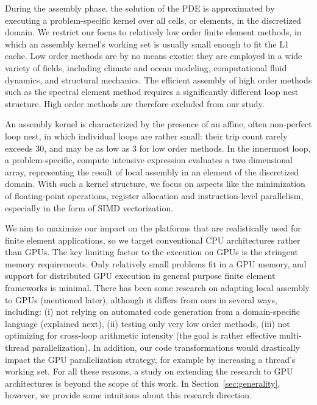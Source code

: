During the assembly phase, the solution of the PDE is approximated by executing a problem-specific kernel over all cells, or elements, in the discretized domain. We restrict our focus to relatively low order finite element methods, in which an assembly kernel's working set is usually small enough to fit the L1 cache. Low order methods are by no means exotic: they are employed in a wide variety of fields, including climate and ocean modeling, computational fluid dynamics, and structural mechanics. The efficient assembly of high order methods such as the spectral element method \citep{spencer} requires a significantly different loop nest structure. High order methods are therefore excluded from our study.

An assembly kernel is characterized by the presence of an affine, often non-perfect loop nest, in which individual loops are rather small: their trip count rarely exceeds 30, and may be as low as 3 for low order methods. In the innermost loop, a problem-specific, compute intensive expression evaluates a two dimensional array, representing the result of local assembly in an element of the discretized domain. With such a kernel structure, we focus on aspects like the minimization of floating-point operations, register allocation and instruction-level parallelism, especially in the form of SIMD vectorization.

We aim to maximize our impact on the platforms that are realistically used for finite element applications, so we target conventional CPU architectures rather than GPUs. 
The key limiting factor to the execution on GPUs is the stringent memory requirements. Only relatively small problems fit in a GPU memory, and support for distributed GPU execution in general purpose finite element frameworks is minimal. There has been some research on adapting local assembly to GPUs (mentioned later), although it differs from ours in several ways, including: (i) not relying on automated code generation from a domain-specific language (explained next), (ii) testing only very low order methods, (iii) not optimizing for cross-loop arithmetic intensity (the goal is rather effective multi-thread parallelization). In addition, our code transformations would drastically impact the GPU parallelization strategy, for example by increasing a thread's working set. For all these reasons, a study on extending the research to GPU architectures is beyond the scope of this work. In Section~\ref{sec:generality}, however, we provide some intuitions about this research direction.

